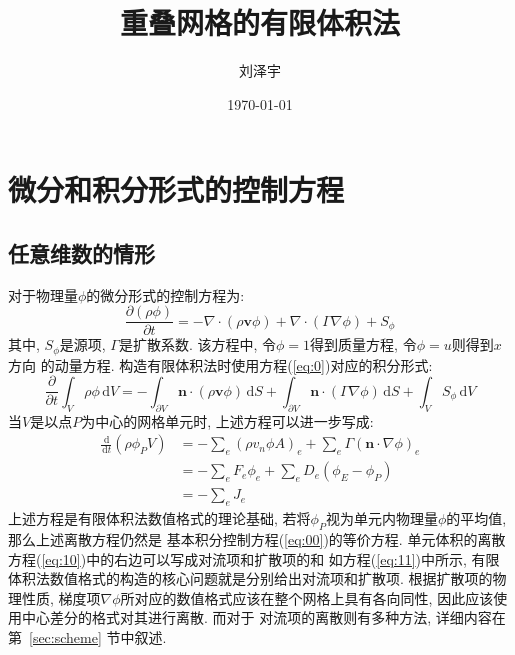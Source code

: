 \documentclass[hyperref,UTF8,titlepage]{ctexart}
\title{重叠网格的有限体积法}
\author{刘泽宇}
\date{\today}
\newcommand{\diff}{\,\mathrm{d}}
\begin{document}
\maketitle

\section{微分和积分形式的控制方程}

\subsection{任意维数的情形}
\label{sec:1.1}
对于物理量$\phi$的微分形式的控制方程为:
\begin{equation}
  \frac{\partial(\rho\phi)}{\partial t} = -\nabla\cdot(\rho\bm{v}\phi)+
  \nabla\cdot(\Gamma\nabla\phi)+S_\phi
  \label{eq:0}
\end{equation}
其中, $S_\phi$是源项, $\Gamma$是扩散系数.
该方程中, 令$\phi=1$得到质量方程, 令$\phi=u$则得到$x$方向
的动量方程. 构造有限体积法时使用方程(\ref{eq:0})对应的积分形式:
\begin{equation}\label{eq:00}
\frac{\partial}{\partial t}\int_V\rho\phi\diff V = -\int_{\partial V}\bm n\cdot(\rho\bm v\phi)\diff S +
\int_{\partial V} \bm n\cdot (\Gamma\nabla\phi)\diff S +\int_V S_\phi \diff V
\end{equation}
当$V$是以点$P$为中心的网格单元时, 上述方程可以进一步写成:
\begin{align}
  \frac{\diff}{\diff t}\left(\rho\phi_PV\right) 
  & = -\sum_e(\rho v_n\phi A)_e+\sum_e\Gamma(\bm n\cdot\nabla\phi)_e \label{eq:10} \\
  & = -\sum_eF_e\phi_e+\sum_e D_e(\phi_E-\phi_P)  \label{eq:11}\\ 
  & = -\sum_eJ_e \label{eq:12}
\end{align}
上述方程是有限体积法数值格式的理论基础, 若将$\phi_P$视为单元内物理量$\phi$的平均值, 那么上述离散方程仍然是
基本积分控制方程(\ref{eq:00})的等价方程. 单元体积的离散方程(\ref{eq:10})中的右边可以写成对流项和扩散项的和
如方程(\ref{eq:11})中所示, 有限体积法数值格式的构造的核心问题就是分别给出对流项和扩散项. 根据扩散项的物理性质,
梯度项$\nabla\phi$所对应的数值格式应该在整个网格上具有各向同性, 因此应该使用中心差分的格式对其进行离散. 而对于
对流项的离散则有多种方法, 详细内容在第~\ref{sec:scheme} 节中叙述.
\end{document}
